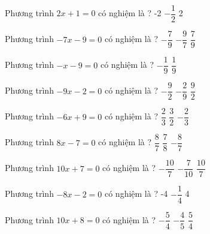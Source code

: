 \begin{ex} 
 Phương trình $2x+1=0$ có nghiệm là ? 
 {-2} 
 {\True $- \dfrac{ 1 }{ 2 } $} 
 {2}  
 \loigiai{} 
 \end{ex} 
 
\begin{ex} 
 Phương trình $-7x-9=0$ có nghiệm là ? 
 {$- \dfrac{ 7 }{ 9 } $} 
 {\True $- \dfrac{ 9 }{ 7 } $} 
 {$ \dfrac{ 7 }{ 9 } $}  
 \loigiai{} 
 \end{ex} 
 
\begin{ex} 
 Phương trình $-x-9=0$ có nghiệm là ? 
 {$- \dfrac{ 1 }{ 9 } $} 
 {} 
 {$ \dfrac{ 1 }{ 9 } $}  
 \loigiai{} 
 \end{ex} 
 
\begin{ex} 
 Phương trình $-9x-2=0$ có nghiệm là ? 
 {$- \dfrac{ 9 }{ 2 } $} 
 {\True $- \dfrac{ 2 }{ 9 } $} 
 {$ \dfrac{ 9 }{ 2 } $}  
 \loigiai{} 
 \end{ex} 
 
\begin{ex} 
 Phương trình $-6x+9=0$ có nghiệm là ? 
 {$ \dfrac{ 2 }{ 3 } $} 
 {\True $ \dfrac{ 3 }{ 2 } $} 
 {$- \dfrac{ 2 }{ 3 } $}  
 \loigiai{} 
 \end{ex} 
 
\begin{ex} 
 Phương trình $8x-7=0$ có nghiệm là ? 
 {$ \dfrac{ 8 }{ 7 } $} 
 {\True $ \dfrac{ 7 }{ 8 } $} 
 {$- \dfrac{ 8 }{ 7 } $}  
 \loigiai{} 
 \end{ex} 
 
\begin{ex} 
 Phương trình $10x+7=0$ có nghiệm là ? 
 {$- \dfrac{ 10 }{ 7 } $} 
 {\True $- \dfrac{ 7 }{ 10 } $} 
 {$ \dfrac{ 10 }{ 7 } $}  
 \loigiai{} 
 \end{ex} 
 
\begin{ex} 
 Phương trình $-8x-2=0$ có nghiệm là ? 
 {-4} 
 {\True $- \dfrac{ 1 }{ 4 } $} 
 {4}  
 \loigiai{} 
 \end{ex} 
 
\begin{ex} 
 Phương trình $10x+8=0$ có nghiệm là ? 
 {$- \dfrac{ 5 }{ 4 } $} 
 {\True $- \dfrac{ 4 }{ 5 } $} 
 {$ \dfrac{ 5 }{ 4 } $}  
 \loigiai{} 
 \end{ex} 
 
